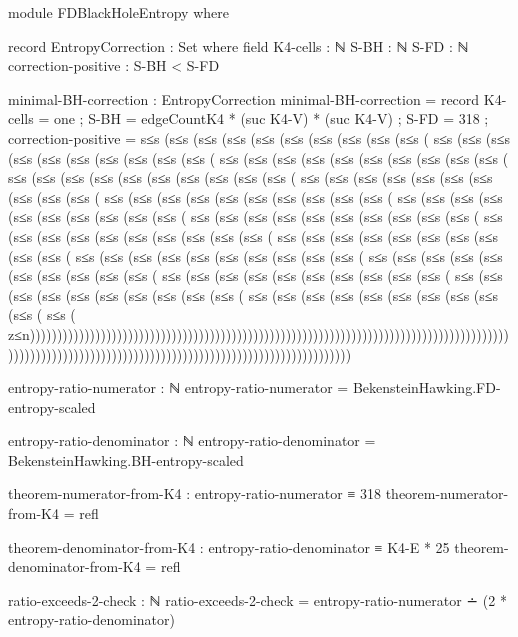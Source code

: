 \documentclass[11pt,a4paper]{book}
\begin{document}
\begin{code}
module FDBlackHoleEntropy where

  record EntropyCorrection : Set where
    field
      K4-cells : ℕ
      S-BH : ℕ
      S-FD : ℕ
      correction-positive : S-BH < S-FD
      
  minimal-BH-correction : EntropyCorrection
  minimal-BH-correction = record
    { K4-cells = one
    ; S-BH = edgeCountK4 * (suc K4-V) * (suc K4-V)
    ; S-FD = 318
    ; correction-positive = s≤s (s≤s (s≤s (s≤s (s≤s (s≤s (s≤s (s≤s (s≤s (s≤s (
                           s≤s (s≤s (s≤s (s≤s (s≤s (s≤s (s≤s (s≤s (s≤s (s≤s (
                           s≤s (s≤s (s≤s (s≤s (s≤s (s≤s (s≤s (s≤s (s≤s (s≤s (
                           s≤s (s≤s (s≤s (s≤s (s≤s (s≤s (s≤s (s≤s (s≤s (s≤s (
                           s≤s (s≤s (s≤s (s≤s (s≤s (s≤s (s≤s (s≤s (s≤s (s≤s (
                           s≤s (s≤s (s≤s (s≤s (s≤s (s≤s (s≤s (s≤s (s≤s (s≤s (
                           s≤s (s≤s (s≤s (s≤s (s≤s (s≤s (s≤s (s≤s (s≤s (s≤s (
                           s≤s (s≤s (s≤s (s≤s (s≤s (s≤s (s≤s (s≤s (s≤s (s≤s (
                           s≤s (s≤s (s≤s (s≤s (s≤s (s≤s (s≤s (s≤s (s≤s (s≤s (
                           s≤s (s≤s (s≤s (s≤s (s≤s (s≤s (s≤s (s≤s (s≤s (s≤s (
                           s≤s (s≤s (s≤s (s≤s (s≤s (s≤s (s≤s (s≤s (s≤s (s≤s (
                           s≤s (s≤s (s≤s (s≤s (s≤s (s≤s (s≤s (s≤s (s≤s (s≤s (
                           s≤s (s≤s (s≤s (s≤s (s≤s (s≤s (s≤s (s≤s (s≤s (s≤s (
                           s≤s (s≤s (s≤s (s≤s (s≤s (s≤s (s≤s (s≤s (s≤s (s≤s (
                           s≤s (s≤s (s≤s (s≤s (s≤s (s≤s (s≤s (s≤s (s≤s (s≤s (
                           s≤s (
                           z≤n)))))))))))))))))))))))))))))))))))))))))))))))))))))))))))))))))))))))))))))))))))))))))))))))))))))))))))))))))))))))))))))))))))))))))))))))))))))))
    }
  
  entropy-ratio-numerator : ℕ
  entropy-ratio-numerator = BekensteinHawking.FD-entropy-scaled
  
  entropy-ratio-denominator : ℕ
  entropy-ratio-denominator = BekensteinHawking.BH-entropy-scaled
  
  theorem-numerator-from-K4 : entropy-ratio-numerator ≡ 318
  theorem-numerator-from-K4 = refl
  
  theorem-denominator-from-K4 : entropy-ratio-denominator ≡ K4-E * 25
  theorem-denominator-from-K4 = refl
  
  ratio-exceeds-2-check : ℕ
  ratio-exceeds-2-check = entropy-ratio-numerator ∸ (2 * entropy-ratio-denominator)
  

\end{code}
\end{document}
